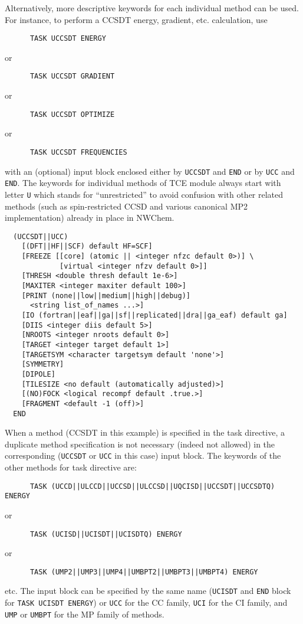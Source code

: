 Alternatively, more descriptive keywords for each individual method can be used.
For instance, to perform a CCSDT energy, gradient, etc. calculation, use
\begin{verbatim}
      TASK UCCSDT ENERGY
\end{verbatim}
or
\begin{verbatim}
      TASK UCCSDT GRADIENT
\end{verbatim}
or
\begin{verbatim}
      TASK UCCSDT OPTIMIZE
\end{verbatim}
or
\begin{verbatim}
      TASK UCCSDT FREQUENCIES
\end{verbatim}
with an (optional) input block enclosed either by \verb+UCCSDT+ and \verb+END+ or
by \verb+UCC+ and \verb+END+.  The keywords for individual methods of TCE module
always start with letter \verb+U+ which stands for ``unrestricted'' to avoid 
confusion with other related methods (such as spin-restricted CCSD and various 
canonical MP2 implementation) already in place in NWChem.
\begin{verbatim}
  (UCCSDT||UCC)
    [(DFT||HF||SCF) default HF=SCF]
    [FREEZE [[core] (atomic || <integer nfzc default 0>)] \
             [virtual <integer nfzv default 0>]]
    [THRESH <double thresh default 1e-6>]
    [MAXITER <integer maxiter default 100>]
    [PRINT (none||low||medium||high||debug)]
      <string list_of_names ...>]
    [IO (fortran||eaf||ga||sf||replicated||dra||ga_eaf) default ga]
    [DIIS <integer diis default 5>]
    [NROOTS <integer nroots default 0>]
    [TARGET <integer target default 1>]
    [TARGETSYM <character targetsym default 'none'>]
    [SYMMETRY]
    [DIPOLE]
    [TILESIZE <no default (automatically adjusted)>]
    [(NO)FOCK <logical recompf default .true.>]
    [FRAGMENT <default -1 (off)>]
  END
\end{verbatim}
When a method (CCSDT in this example) is specified in the task directive, 
a duplicate method specification
is not necessary (indeed not allowed) in the corresponding (\verb+UCCSDT+ or \verb+UCC+ in this case) 
input block.  The keywords of the other methods for task directive are:
\begin{verbatim}
      TASK (UCCD||ULCCD||UCCSD||ULCCSD||UQCISD||UCCSDT||UCCSDTQ) ENERGY
\end{verbatim}
or
\begin{verbatim}
      TASK (UCISD||UCISDT||UCISDTQ) ENERGY
\end{verbatim}
or
\begin{verbatim}
      TASK (UMP2||UMP3||UMP4||UMBPT2||UMBPT3||UMBPT4) ENERGY
\end{verbatim}
etc.  The input block can be specified by the same name (\verb+UCISDT+ and \verb+END+
block for \verb+TASK UCISDT ENERGY+) or \verb+UCC+ for the CC family, \verb+UCI+ for 
the CI family, and \verb+UMP+ or \verb+UMBPT+ for the MP family of methods.

